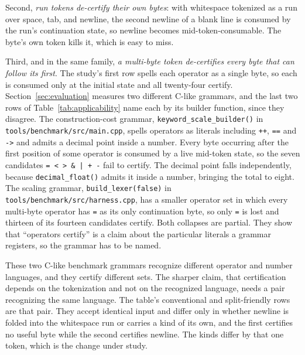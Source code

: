 \documentclass[11pt,a4paper]{article}
\theoremstyle{definition}
\theoremstyle{plain}
\newcommand{\code}[1]{\texttt{#1}}
\begin{document}
Second, \emph{run tokens de-certify their own bytes}: with whitespace tokenized as a run over space, tab, and newline,
the second newline of a blank line is consumed by the run's continuation state, so newline becomes mid-token-consumable.
The byte's own token kills it, which is easy to miss.

Third, and in the same family, \emph{a multi-byte token de-certifies every byte that can follow its first}. The study's
first row spells each operator as a single byte, so each is consumed only at the initial state and all twenty-four
certify. Section~\ref{sec:evaluation} measures two different C-like grammars, and the last two rows of
Table~\ref{tab:applicability} name each by its builder function, since they disagree. The construction-cost grammar,
\code{keyword\_scale\_builder()} in \code{tools/benchmark/src/main.cpp}, spells operators as literals including
\code{++}, \code{==} and \code{->} and admits a decimal point inside a number. Every byte occurring after the first
position of some operator is consumed by a live mid-token state, so the seven candidates \code{= < > \& | + -} fail to
certify. The decimal point falls independently, because \code{decimal\_float()} admits it inside a number, bringing the
total to eight. The scaling grammar, \code{build\_lexer(false)} in \code{tools/benchmark/src/harness.cpp}, has a smaller
operator set in which every multi-byte operator has \code{=} as its only continuation byte, so only \code{=} is lost and
thirteen of its fourteen candidates certify. Both collapses are partial. They show that ``operators certify'' is a claim
about the particular literals a grammar registers, so the grammar has to be named.

These two C-like benchmark grammars recognize different operator and number languages, and they certify different sets.
The sharper claim, that certification depends on the tokenization and not on the recognized language, needs a pair
recognizing the same language. The table's conventional and split-friendly rows are that pair. They accept identical
input and differ only in whether newline is folded into the whitespace run or carries a kind of its own, and the first
certifies no useful byte while the second certifies newline. The kinds differ by that one token, which is the change
under study.
\end{document}
